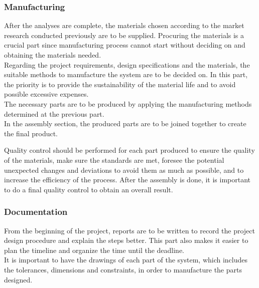 \documentclass[12pt]{report}
\begin{document}
\subsubsection{Manufacturing}
After the analyses are complete, the materials chosen according to the market research conducted previously are to be supplied. Procuring the materials is a crucial part since manufacturing process cannot start without deciding on and obtaining the materials needed. \\

Regarding the project requirements, design specifications and the materials, the suitable methods to manufacture the system are to be decided on. In this part, the priority is to provide the sustainability of the material life and to avoid possible excessive expenses.  \\

The necessary parts are to be produced by applying the manufacturing methods determined at the previous part.  \\
 
In the assembly section, the produced parts are to be joined together to create the final product. \\


Quality control should be performed for each part produced to ensure the quality of the materials, make sure the standards are met, foresee the potential unexpected changes and deviations to avoid them as much as possible, and to increase the efficiency of the process. After the assembly is done, it is important to do a final quality control to obtain an overall result. 

\subsubsection{Documentation}

From the beginning of the project, reports are to be written to record the project design procedure and explain the steps better. This part also makes it easier to plan the timeline and organize the time until the deadline. \\

It is important to have the drawings of each part of the system, which includes the tolerances, dimensions and constraints, in order to manufacture the parts designed. \\
\end{document}
